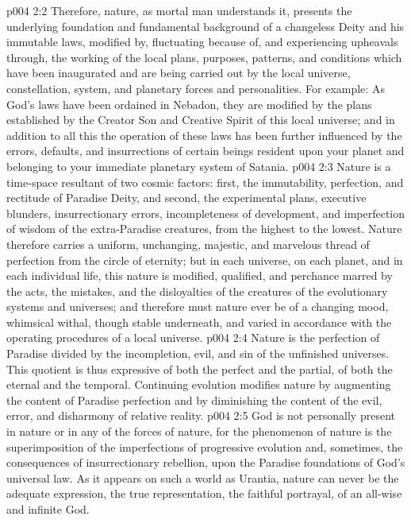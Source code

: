 \vs p004 2:2 Therefore, nature, as mortal man understands it, presents the underlying foundation and fundamental background of a changeless Deity and his immutable laws, modified by, fluctuating because of, and experiencing upheavals through, the working of the local plans, purposes, patterns, and conditions which have been inaugurated and are being carried out by the local universe, constellation, system, and planetary forces and personalities. For example: As God’s laws have been ordained in Nebadon, they are modified by the plans established by the Creator Son and Creative Spirit of this local universe; and in addition to all this the operation of these laws has been further influenced by the errors, defaults, and insurrections of certain beings resident upon your planet and belonging to your immediate planetary system of Satania.
\pc \vs p004 2:3 Nature is a time\hyp{}space resultant of two cosmic factors: first, the immutability, perfection, and rectitude of Paradise Deity, and second, the experimental plans, executive blunders, insurrectionary errors, incompleteness of development, and imperfection of wisdom of the extra\hyp{}Paradise creatures, from the highest to the lowest. Nature therefore carries a uniform, unchanging, majestic, and marvelous thread of perfection from the circle of eternity; but in each universe, on each planet, and in each individual life, this nature is modified, qualified, and perchance marred by the acts, the mistakes, and the disloyalties of the creatures of the evolutionary systems and universes; and therefore must nature ever be of a changing mood, whimsical withal, though stable underneath, and varied in accordance with the operating procedures of a local universe.
\vs p004 2:4 Nature is the perfection of Paradise divided by the incompletion, evil, and sin of the unfinished universes. This quotient is thus expressive of both the perfect and the partial, of both the eternal and the temporal. Continuing evolution modifies nature by augmenting the content of Paradise perfection and by diminishing the content of the evil, error, and disharmony of relative reality.
\pc \vs p004 2:5 God is not personally present in nature or in any of the forces of nature, for the phenomenon of nature is the superimposition of the imperfections of progressive evolution and, sometimes, the consequences of insurrectionary rebellion, upon the Paradise foundations of God’s universal law. As it appears on such a world as Urantia, nature can never be the adequate expression, the true representation, the faithful portrayal, of an all\hyp{}wise and infinite God.
